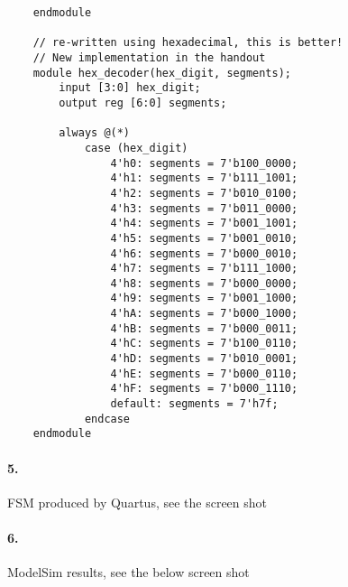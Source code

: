 \documentclass{article}
\begin{document}
\begin{verbatim}
    endmodule

    // re-written using hexadecimal, this is better!
    // New implementation in the handout
    module hex_decoder(hex_digit, segments);
        input [3:0] hex_digit;
        output reg [6:0] segments;
    
        always @(*)
            case (hex_digit)
                4'h0: segments = 7'b100_0000;
                4'h1: segments = 7'b111_1001;
                4'h2: segments = 7'b010_0100;
                4'h3: segments = 7'b011_0000;
                4'h4: segments = 7'b001_1001;
                4'h5: segments = 7'b001_0010;
                4'h6: segments = 7'b000_0010;
                4'h7: segments = 7'b111_1000;
                4'h8: segments = 7'b000_0000;
                4'h9: segments = 7'b001_1000;
                4'hA: segments = 7'b000_1000;
                4'hB: segments = 7'b000_0011;
                4'hC: segments = 7'b100_0110;
                4'hD: segments = 7'b010_0001;
                4'hE: segments = 7'b000_0110;
                4'hF: segments = 7'b000_1110;   
                default: segments = 7'h7f;
            endcase
    endmodule

\end{verbatim}

\paragraph{5.} FSM produced by Quartus, see the screen shot

\paragraph{6.} ModelSim results, see the below screen shot
\end{document}
